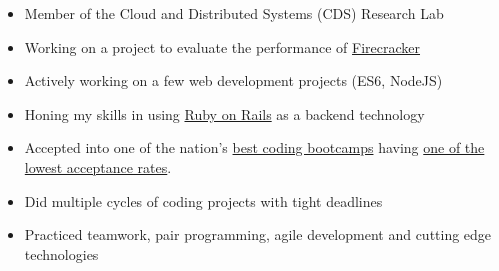\documentclass[10pt,a4paper]{altacv}
\begin{document}


\begin{fullwidth}
\makecvheader
\end{fullwidth}



\begin{itemize}
\item \justifying Member of the Cloud and Distributed Systems (CDS) Research Lab
\item \justifying Working on a project to evaluate the performance of \href{https://firecracker-microvm.github.io/}{Firecracker}
\end{itemize}

\divider

\begin{itemize}
\item \justifying Actively working on a few web development projects (ES6, NodeJS)
\item \justifying Honing my skills in using \href{https://rubyonrails.org/}{\textcolor{AccentColor}{Ruby on Rails}} as a backend technology
\end{itemize}

\divider

\begin{itemize}
\item \justifying Accepted into one of the nation's \href{https://www.switchup.org/bootcamps/app-academy}{best coding bootcamps} having \href{https://www.quora.com/How-hard-is-it-to-get-into-App-Academy}{one of the lowest acceptance rates}.
\item \justifying Did multiple cycles of coding projects with tight deadlines
\item \justifying Practiced teamwork, pair programming, agile development and cutting edge technologies
\end{itemize}
\end{document}
